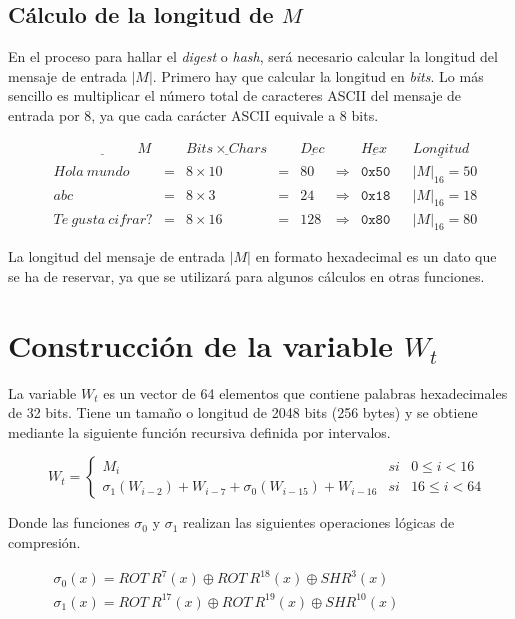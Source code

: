 \documentclass{article}
\begin{document}
    \subsection{Cálculo de la longitud de $M$}
        En el proceso para hallar el \textit{digest} o \textit{hash}, será necesario calcular la longitud del mensaje de entrada $|M|$. Primero hay que calcular la longitud en \textit{bits}. Lo más sencillo es multiplicar el número total de caracteres ASCII del mensaje de entrada por 8, ya que cada carácter ASCII equivale a 8 bits.
            \begin{figure}[H]
            \centering
                $\begin{array}{rccclclcl}
                    \underline{\qquad \qquad \qquad M} & & \underline{Bits \times Chars} & & \underline{Dec} & & \underline{Hex} & & \underline{Longitud}\\
                    Hola \ mundo & = & 8 \times 10 & = & 80 & \Rightarrow & \texttt{0x50} & & |M|_{16} = 50 \\
                    abc & = & 8 \times 3 \ & = & 24 & \Rightarrow & \texttt{0x18} & & |M|_{16} = 18  \\
                    Te \ gusta \ cifrar? & = & 8 \times 16 & = & 128 & \Rightarrow & \texttt{0x80} & & |M|_{16} = 80
                \end{array}$
            \end{figure}
        La longitud del mensaje de entrada $|M|$ en formato hexadecimal es un dato que se ha de reservar, ya que se utilizará para algunos cálculos en otras funciones.

\section{Construcción de la variable $W_{t}$}
    La variable $W_{t}$ es un vector de 64 elementos que contiene palabras hexadecimales de 32 bits. Tiene un tamaño o longitud de 2048 bits (256 bytes) y se obtiene mediante la siguiente función recursiva definida por intervalos.
        \begin{figure}[H]
        \centering
            $W_{t} = \left \{
            \begin{array}{lcl}
                M_{i} & si & 0 \le i < 16 \\
                \sigma_{1}(W_{i-2})+W_{i-7}+\sigma_{0}(W_{i-15})+W_{i-16} & si & 16 \le i < 64
            \end{array}
            \right .$
        \end{figure}
    Donde las funciones  $\sigma_{0}$ y $\sigma_{1}$ realizan las siguientes operaciones lógicas de compresión.
        \begin{figure}[H]
        \centering
            $\begin{array}{l}
                \sigma_{0}(x) = ROT \ R^{7}(x) \oplus ROT \ R^{18}(x) \oplus SHR^{3}(x) \\
                \sigma_{1}(x) = ROT \ R^{17}(x) \oplus ROT \ R^{19}(x) \oplus SHR^{10}(x)
            \end{array}$
        \end{figure}
    
\end{document}
